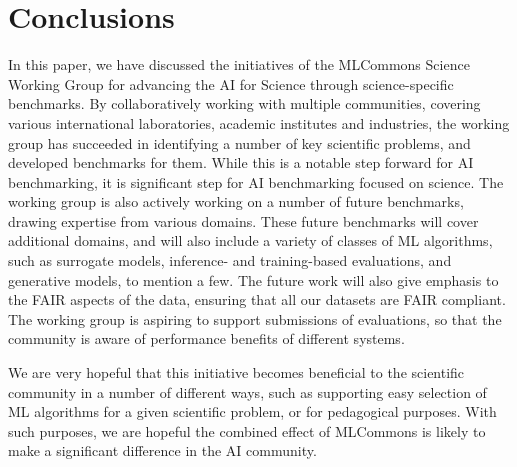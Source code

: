 \section{Conclusions}
\label{sec:conclusions}

In this paper, we have discussed the initiatives of the MLCommons Science Working Group for advancing the AI for Science through science-specific benchmarks. By collaboratively working with multiple communities, covering various international laboratories, academic institutes and industries, the working group has succeeded in identifying a number of key scientific problems, and developed benchmarks for them. While this is a notable step forward for AI benchmarking, it is significant step for AI benchmarking focused on science. The working group is also actively working on a number of future benchmarks, drawing expertise from various domains. These future benchmarks will cover additional domains, and will also include a variety of classes of ML algorithms, such as surrogate models, inference- and training-based evaluations, and generative models, to mention a few. The future work will also give emphasis to the FAIR aspects of the data, ensuring that all our datasets are FAIR compliant. The working group is aspiring to support submissions of evaluations, so that the community is aware of performance benefits of  different systems. 

We are very hopeful that this initiative becomes beneficial to the scientific community in a number of different ways, such as supporting easy selection of ML algorithms for a given scientific problem, or for pedagogical purposes. With such purposes, we are hopeful the combined effect of MLCommons is likely to make a significant difference in the AI community. 